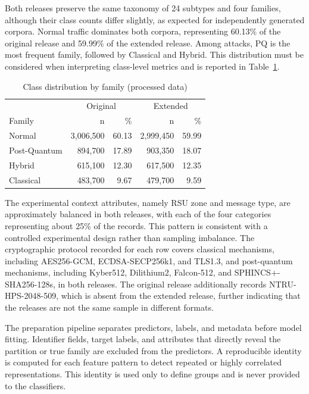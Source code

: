 \documentclass{IEEEoj}
\begin{document}
Both releases preserve the same taxonomy of 24 subtypes and four families, although their class counts differ slightly, as expected for independently generated corpora. Normal traffic dominates both corpora, representing 60.13\% of the original release and 59.99\% of the extended release. Among attacks, PQ is the most frequent family, followed by Classical and Hybrid. This distribution must be considered when interpreting class-level metrics and is reported in Table~\ref{tab:family_dist}.

\begin{table}[!t]
\caption{Class distribution by family (processed data)}
\label{tab:family_dist}
\centering
\begin{tabular}{lrrrr}
\toprule
 & \multicolumn{2}{c}{Original} & \multicolumn{2}{c}{Extended} \\
Family & n & \% & n & \% \\
\midrule
Normal & 3,006,500 & 60.13 & 2,999,450 & 59.99 \\
Post-Quantum & 894,700 & 17.89 & 903,350 & 18.07 \\
Hybrid & 615,100 & 12.30 & 617,500 & 12.35 \\
Classical & 483,700 & 9.67 & 479,700 & 9.59 \\
\bottomrule
\end{tabular}
\end{table}

The experimental context attributes, namely RSU zone and message type, are approximately balanced in both releases, with each of the four categories representing about 25\% of the records. This pattern is consistent with a controlled experimental design rather than sampling imbalance. The cryptographic protocol recorded for each row covers classical mechanisms, including AES256-GCM, ECDSA-SECP256k1, and TLS1.3, and post-quantum mechanisms, including Kyber512, Dilithium2, Falcon-512, and SPHINCS+-SHA256-128s, in both releases. The original release additionally records NTRU-HPS-2048-509, which is absent from the extended release, further indicating that the releases are not the same sample in different formats.

\label{sec:leakage_audit}
The preparation pipeline separates predictors, labels, and metadata before model fitting. Identifier fields, target labels, and attributes that directly reveal the partition or true family are excluded from the predictors. A reproducible identity is computed for each feature pattern to detect repeated or highly correlated representations. This identity is used only to define groups and is never provided to the classifiers.
\end{document}
